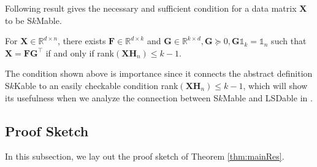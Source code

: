 \documentclass[journal]{IEEEtran}
\begin{document}
Following result gives the necessary and sufficient condition for a data matrix $\mathbf{X}$ to be S$k$Mable.

\begin{thm}\label{thm:sfmable}
	For $\mathbf{X}\in\mathbb{R}^{d\times n}$, there exists $\mathbf{F}\in\mathbb{R}^{d\times k}$ and $\mathbf{G}\in\mathbb{R}^{k\times d}, \mathbf{G}\succeq 0,\mathbf{G}\mathbb{1}_k = \mathbb{1}_n$ such that $\mathbf{X}=\mathbf{FG}^\top$ if and only if rank$(\mathbf{X}\mathbf{H}_n) \leq k-1$.
\end{thm}
The condition shown above is importance since it connects the abstract definition S$k$Kable to an easily checkable condition rank$(\mathbf{XH}_n) \leq k-1$, which will show its usefulness when we analyze the connection between S$k$Mable and LSDable in .

\subsection{Proof Sketch} \label{sec:proofSketch}
In this subsection, we lay out the proof sketch of Theorem \ref{thm:mainRes}.
\end{document}
